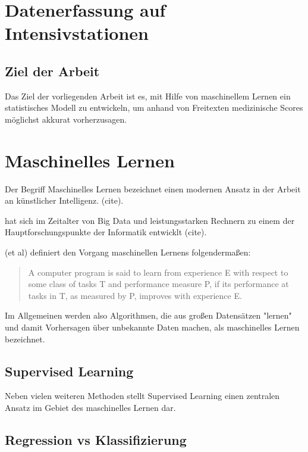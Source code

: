 \section{Datenerfassung auf Intensivstationen}

\subsection{Ziel der Arbeit}

Das Ziel der vorliegenden Arbeit ist es, mit Hilfe von maschinellem Lernen ein statistisches Modell zu entwickeln, um anhand von Freitexten medizinische Scores möglichst akkurat vorherzusagen.

\section{Maschinelles Lernen}

Der Begriff Maschinelles Lernen bezeichnet einen modernen Ansatz in der Arbeit an künstlicher Intelligenz. (cite).

hat sich im Zeitalter von Big Data und leistungsstarken Rechnern zu einem der Hauptforschungspunkte der Informatik entwicklt (cite). 

(et al) definiert den Vorgang maschinellen Lernens folgendermaßen:

\begin{quote}
    {\foreignlanguage{english}{A computer program is said to learn from experience E with respect to some class of tasks T and performance measure P, if its performance at tasks in T, as measured by P, improves with experience E.}}
\end{quote}

Im Allgemeinen werden also Algorithmen, die aus großen Datensätzen "lernen" und damit Vorhersagen über unbekannte Daten machen, als maschinelles Lernen bezeichnet.

\subsection{Supervised Learning}

Neben vielen weiteren Methoden stellt Supervised Learning einen zentralen Ansatz im Gebiet des maschinelles Lernen dar.

\subsection{Regression vs Klassifizierung}

